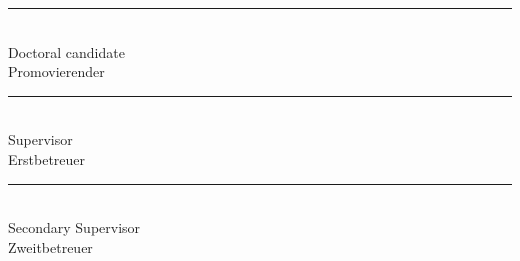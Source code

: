 \hspace*{1.2cm}
\begin{minipage}{0.78\textwidth}
\begin{center}

\begin{minipage}[t]{0.30\textwidth}
\centering
\rule{\textwidth}{0.4pt}\\[-0.2ex]
{\hstitlefont\small Doctoral candidate}\\
{\hstitlefont\footnotesize Promovierender}
\end{minipage}
\hfill
\begin{minipage}[t]{0.30\textwidth}
\centering
\rule{\textwidth}{0.4pt}\\[-0.2ex]
{\hstitlefont\small Supervisor}\\
{\hstitlefont\footnotesize Erstbetreuer}
\end{minipage}
\hfill
\begin{minipage}[t]{0.30\textwidth}
\centering
\rule{\textwidth}{0.4pt}\\[-0.2ex]
{\hstitlefont\small Secondary Supervisor}\\
{\hstitlefont\footnotesize Zweitbetreuer}
\end{minipage}

\end{center}
\end{minipage}

\vspace*{0.8cm}

\restoregeometry

